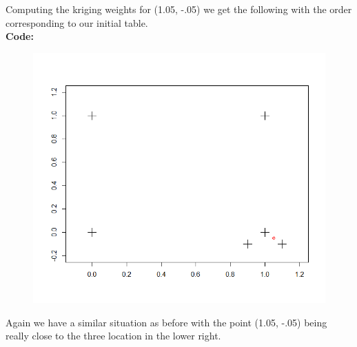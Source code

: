 \documentclass[12pt]{article}
\makeatletter
\theoremstyle{homework}
\newenvironment{exercise}[1]
{\def\@currentlabel{#1}\exercisecore}
{\endexercisecore}
\makeatother
\begin{document}
\begin{exercise}{3}
  Computing the kriging weights for (1.05, -.05) we get the following with the order corresponding to our initial table. 
  \begin{equation*}
    [-0.00514, -0.00158,  0.00155,  0.46600,  0.48600,  0.05300]
  \end{equation*}
  \textbf{Code:}
  \begin{center}
  
  \end{center}
  \begin{figure}[H]
    \begin{center}
    \includegraphics[width = \textwidth]{Rplot09.png}
    \end{center}
  \end{figure}
  Again we have a similar situation as before with the point (1.05, -.05) being really close to the three location in the lower right.





  
  










  
  







\end{exercise}
\end{document}
